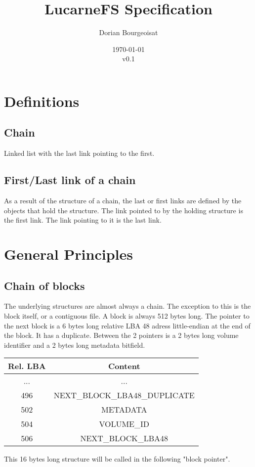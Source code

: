 \documentclass{article}
\title{LucarneFS Specification}
\author{Dorian Bourgeoisat}
\date{\today\\v0.1}
\begin{document}
\maketitle
\newpage
\tableofcontents

\newpage
\section{Definitions}
\subsection{Chain}
Linked list with the last link pointing to the first.
\subsection{First/Last link of a chain}
As a result of the structure of a chain, the last or first links are defined by the objects that hold the structure. The link pointed to by the holding structure is the first link. The link pointing to it is the last link.

\section{General Principles}
\subsection{Chain of blocks}
The underlying structures are almost always a chain. The exception to this is the block itself, or a contiguous file. A block is always 512 bytes long.\newline
The pointer to the next block is a 6 bytes long relative LBA 48 adress little-endian at the end of the block. It has a duplicate. Between the 2 pointers is a 2 bytes long volume identifier and a 2 bytes long metadata bitfield.

\begin{tabular}{|c|c|}
    \hline
    Rel. LBA & Content \\
    \hline
    ... & ...  \\
    \hline
    496 & NEXT\_BLOCK\_LBA48\_DUPLICATE \\
    \hline
    502 & METADATA  \\
    \hline
    504 & VOLUME\_ID  \\
    \hline
    506 & NEXT\_BLOCK\_LBA48  \\
    \hline
\end{tabular}
\newline
This 16 bytes long structure will be called in the following "block pointer".
\end{document}
